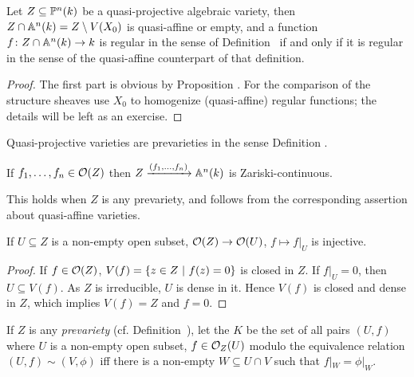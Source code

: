 \documentclass[a4paper,parskip=half,numbers=enddot, DIV=12, headheight=30pt]{scrreprt}
\begin{document}
\begin{prop}
    Let $Z\subseteq \mathbb{P}^n(k)$ be a quasi-projective algebraic variety, then $Z\cap \mathbb{A}^n(k) = Z \setminus V(X_0)$ is quasi-affine or empty, and a function $f\colon Z\cap \IA^n(k)\morphism k$ is regular in the sense of Definition~ if and only if it is regular in the sense of the quasi-affine counterpart of that definition. 
\end{prop}
\begin{proof}
    The first part is obvious by Proposition . For the comparison of the structure sheaves use $X_0$ to homogenize (quasi-affine) regular functions; the details will be left as an exercise.
\end{proof}
\begin{cor*}
    Quasi-projective varieties are prevarieties in the sense Definition .
\end{cor*}
\begin{cor}
    If $f_1,\ldots, f_n\in \mathcal{O}(Z)$ then $Z\xrightarrow{(f_1,\ldots, f_n)}\mathbb{A}^n(k)$ is Zariski-continuous.
\end{cor}
\begin{rem*}
    This holds when $Z$ is any prevariety, and follows from the corresponding assertion about quasi-affine varieties.
\end{rem*}
\begin{cor}
    If $U\subseteq Z$ is a non-empty open subset, $\Oo(Z)\morphism \Oo(U)$, $f\mapsto f|_U$ is injective.
\end{cor}
\begin{proof}
    If $f\in \mathcal{O}(Z)$, $V(f) = \left\{z\in Z\ \middle|\  f(z)=0\right\}$ is closed in $Z$. If $f|_U=0$, then $U\subseteq V(f)$. As $Z$ is irreducible, $U$ is dense in it. Hence $V(f)$ is closed and dense in $Z$, which implies $V(f)=Z$ and $f=0$.
\end{proof}
\begin{defi}
    If $Z$ is any \emph{prevariety} (cf. Definition~), let the  $K$ be the set of all pairs $(U,f)$ where $U$ is a non-empty open subset, $f\in\mathcal{O}_Z(U)$ modulo the equivalence relation $(U,f)\sim (V,\phi)$ iff there is a non-empty $W\subseteq U\cap V$ such that $f|_W= \phi|_W$.
\end{defi}
\end{document}
